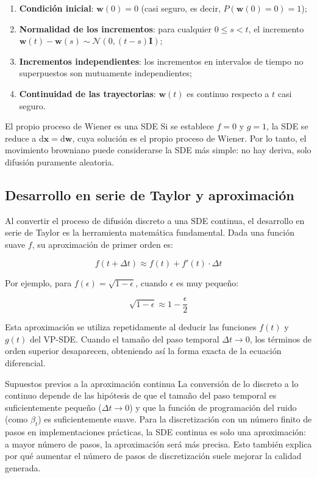 \documentclass[a4paper]{article}
\begin{document}
\begin{enumerate}
    \item \textbf{Condición inicial}: $\mathbf{w}(0) = 0$ (casi seguro, es decir, $P(\mathbf{w}(0)=0) = 1$);
    \item \textbf{Normalidad de los incrementos}: para cualquier $0 \le s < t$, el incremento $\mathbf{w}(t) - \mathbf{w}(s) \sim \mathcal{N}(0, (t-s)\mathbf{I})$;
    \item \textbf{Incrementos independientes}: los incrementos en intervalos de tiempo no superpuestos son mutuamente independientes;
    \item \textbf{Continuidad de las trayectorias}: $\mathbf{w}(t)$ es continuo respecto a $t$ casi seguro.
\end{enumerate}

\begin{knowledgebox}{El propio proceso de Wiener es una SDE}
Si se establece $f = 0$ y $g = 1$, la SDE se reduce a $\mathrm{d}\mathbf{x} = \mathrm{d}\mathbf{w}$, cuya solución es el propio proceso de Wiener. Por lo tanto, el movimiento browniano puede considerarse la SDE más simple: no hay deriva, solo difusión puramente aleatoria.
\end{knowledgebox}

\subsection{Desarrollo en serie de Taylor y aproximación}

Al convertir el proceso de difusión discreto a una SDE continua, el desarrollo en serie de Taylor es la herramienta matemática fundamental. Dada una función suave $f$, su aproximación de primer orden es:

$$
f(t + \Delta t) \approx f(t) + f'(t) \cdot \Delta t
$$

Por ejemplo, para $f(\epsilon) = \sqrt{1 - \epsilon}$, cuando $\epsilon$ es muy pequeño:

$$
\sqrt{1 - \epsilon} \approx 1 - \frac{\epsilon}{2}
$$

Esta aproximación se utiliza repetidamente al deducir las funciones $f(t)$ y $g(t)$ del VP-SDE. Cuando el tamaño del paso temporal $\Delta t \to 0$, los términos de orden superior desaparecen, obteniendo así la forma exacta de la ecuación diferencial.

\begin{warningbox}{Supuestos previos a la aproximación continua}
La conversión de lo discreto a lo continuo depende de las hipótesis de que el tamaño del paso temporal es suficientemente pequeño ($\Delta t \to 0$) y que la función de programación del ruido (como $\beta_t$) es suficientemente suave. Para la discretización con un número finito de pasos en implementaciones prácticas, la SDE continua es solo una aproximación: a mayor número de pasos, la aproximación será más precisa. Esto también explica por qué aumentar el número de pasos de discretización suele mejorar la calidad generada.
\end{warningbox}
\end{document}
